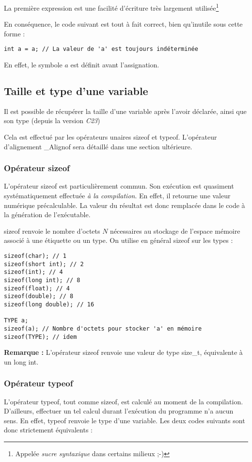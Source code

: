 \documentclass[../../../main.tex]{subfiles}
\begin{document}
La première expression est une facilité d'écriture très largement utilisée\footnote{Appelée \textit{sucre syntaxique} dans certains milieux ;-)}
 
En conséquence, le code suivant est tout à fait correct, bien qu'inutile sous cette forme :
\begin{verbatim}
int a = a; // La valeur de 'a' est toujours indéterminée
\end{verbatim}
En effet, le symbole $a$ est définit avant l'assignation.
\subsection{Taille et type d'une variable}
Il est possible de récupérer la taille d'une variable après l'avoir déclarée, ainsi que son type (depuis la version \textit{C23})
 
Cela est effectué par les opérateurs unaires \textsf{sizeof} et \textsf{typeof}. L'opérateur d'alignement \textsf{\_Alignof} sera détaillé dans une section ultérieure.
 
\subsubsection{Opérateur \textsf{sizeof}}
 
L'opérateur \textsf{sizeof} est particulièrement commun. Son exécution est quasiment systématiquement effectuée \textit{à la compilation}. En effet, il retourne une valeur numérique précalculable. La valeur du résultat est donc remplacée dans le code à la génération de l'exécutable.
 
\textsf{sizeof} renvoie le nombre d'octets $N$ nécessaires au stockage de l'espace mémoire associé à une étiquette ou un type. On utilise en général \textsf{sizeof} sur les types :
\begin{verbatim}
sizeof(char); // 1
sizeof(short int); // 2
sizeof(int); // 4
sizeof(long int); // 8
sizeof(float); // 4
sizeof(double); // 8
sizeof(long double); // 16

TYPE a;
sizeof(a); // Nombre d'octets pour stocker 'a' en mémoire
sizeof(TYPE); // idem
\end{verbatim}
\textbf{Remarque :} L'opérateur \textsf{sizeof} renvoie une valeur de type \textsf{size\_t}, équivalente à un \textsf{long int}.

\subsubsection{Opérateur \textsf{typeof}}
L'opérateur \textsf{typeof}, tout comme \textsf{sizeof}, est calculé au moment de la compilation. D'ailleurs, effectuer un tel calcul durant l'exécution du programme n'a aucun sens. En effet, \textsf{typeof} renvoie le type d'une variable. Les deux codes suivants sont donc strictement équivalents : 
\end{document}
